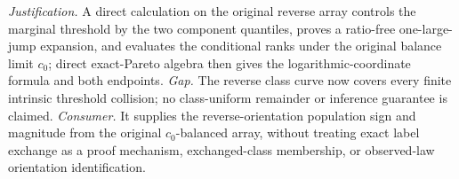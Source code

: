 \documentclass{article}
\begin{document}
\par\smallskip\noindent \textit{Justification.} A direct calculation on the original reverse array controls the marginal threshold by the two component quantiles, proves a ratio-free one-large-jump expansion, and evaluates the conditional ranks under the original balance limit \(c_0\); direct exact-Pareto algebra then gives the logarithmic-coordinate formula and both endpoints. \textit{Gap.} The reverse class curve now covers every finite intrinsic threshold collision; no class-uniform remainder or inference guarantee is claimed. \textit{Consumer.} It supplies the reverse-orientation population sign and magnitude from the original \(c_0\)-balanced array, without treating exact label exchange as a proof mechanism, exchanged-class membership, or observed-law orientation identification.
\end{document}
